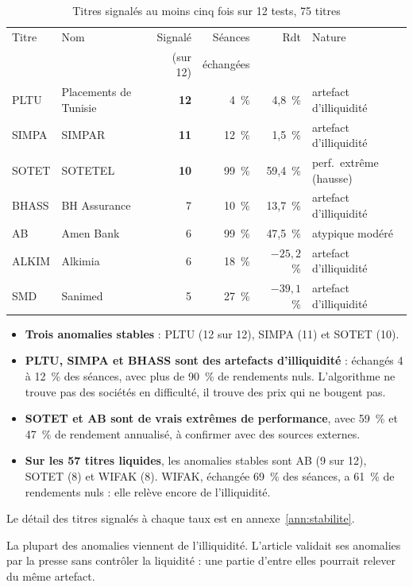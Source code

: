 \documentclass[11pt,a4paper]{article}
\newcommand{\pc}{~\%}
\begin{document}
\begin{table}[H]\centering\small
\caption{Titres signalés au moins cinq fois sur 12 tests, 75 titres}\label{tab:anomalies}
\begin{tabular}{llrrrl}\toprule
Titre & Nom & Signalé & Séances & Rdt & Nature \\
 & & (sur 12) & échangées & & \\ \midrule
PLTU & Placements de Tunisie & \textbf{12} & 4\pc{} & 4,8\pc{} & artefact d'illiquidité \\
SIMPA & SIMPAR & \textbf{11} & 12\pc{} & 1,5\pc{} & artefact d'illiquidité \\
SOTET & SOTETEL & \textbf{10} & 99\pc{} & 59,4\pc{} & perf.\ extrême (hausse) \\
BHASS & BH Assurance & 7 & 10\pc{} & 13,7\pc{} & artefact d'illiquidité \\
AB & Amen Bank & 6 & 99\pc{} & 47,5\pc{} & atypique modéré \\
ALKIM & Alkimia & 6 & 18\pc{} & $-25{,}2$\pc{} & artefact d'illiquidité \\
SMD & Sanimed & 5 & 27\pc{} & $-39{,}1$\pc{} & artefact d'illiquidité \\
\bottomrule\end{tabular}
\end{table}

\begin{itemize}
  \item \textbf{Trois anomalies stables} : PLTU (12 sur 12), SIMPA (11) et SOTET (10).
  \item \textbf{PLTU, SIMPA et BHASS sont des artefacts d'illiquidité} : échangés 4 à 12\pc{} des séances, avec plus de 90\pc{} de rendements nuls. L'algorithme ne trouve pas des sociétés en difficulté, il trouve des prix qui ne bougent pas.
  \item \textbf{SOTET et AB sont de vrais extrêmes de performance}, avec 59\pc{} et 47\pc{} de rendement annualisé, à confirmer avec des sources externes.
  \item \textbf{Sur les 57 titres liquides}, les anomalies stables sont AB (9 sur 12), SOTET (8) et WIFAK (8). WIFAK, échangée 69\pc{} des séances, a 61\pc{} de rendements nuls : elle relève encore de l'illiquidité.
\end{itemize}
Le détail des titres signalés à chaque taux est en annexe~\ref{ann:stabilite}.

\begin{retenir}
La plupart des anomalies viennent de l'illiquidité. L'article validait ses anomalies par la presse sans contrôler la liquidité : une partie d'entre elles pourrait relever du même artefact.
\end{retenir}
\end{document}
